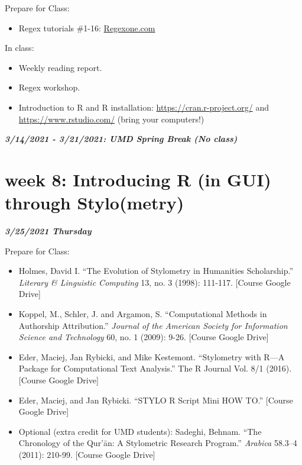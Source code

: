 \documentclass[
]{book}
\providecommand{\tightlist}{%
  \setlength{\itemsep}{0pt}\setlength{\parskip}{0pt}}
\begin{document}
Prepare for Class:

\begin{itemize}
\tightlist
\item
  Regex tutorials \#1-16: \url{Regexone.com}
\end{itemize}

In class:

\begin{itemize}
\tightlist
\item
  Weekly reading report.
\item
  Regex workshop.
\item
  Introduction to R and R installation: \url{https://cran.r-project.org/} and \url{https://www.rstudio.com/} (bring your computers!)
\end{itemize}

\textbf{\emph{3/14/2021 - 3/21/2021: UMD Spring Break (No class)}}

\hypertarget{week-8-introducing-r-in-gui-through-stylometry-1}{%
\chapter{week 8: Introducing R (in GUI) through Stylo(metry)}\label{week-8-introducing-r-in-gui-through-stylometry-1}}

\textbf{\emph{3/25/2021 Thursday}}

Prepare for Class:

\begin{itemize}
\tightlist
\item
  Holmes, David I. ``The Evolution of Stylometry in Humanities Scholarship.'' \emph{Literary \& Linguistic Computing} 13, no. 3 (1998): 111-117. {[}Course Google Drive{]}
\item
  Koppel, M., Schler, J. and Argamon, S. ``Computational Methods in Authorship Attribution.'' \emph{Journal of the American Society for Information Science and Technology} 60, no. 1 (2009): 9-26. {[}Course Google Drive{]}\\
\item
  Eder, Maciej, Jan Rybicki, and Mike Kestemont. ``Stylometry with R---A Package for Computational Text Analysis.'' The R Journal Vol. 8/1 (2016). {[}Course Google Drive{]}\\
\item
  Eder, Maciej, and Jan Rybicki. ``STYLO R Script Mini HOW TO.'' {[}Course Google Drive{]}\\
\item
  Optional (extra credit for UMD students): Sadeghi, Behnam. ``The Chronology of the Qur'ān: A Stylometric Research Program.'' \emph{Arabica} 58.3--4 (2011): 210-99. {[}Course Google Drive{]}
\end{itemize}
\end{document}
